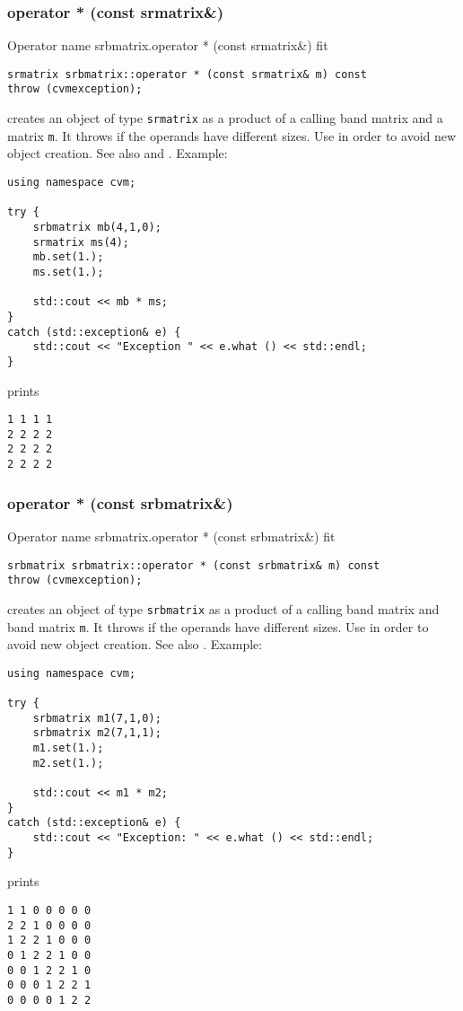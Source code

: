 \subsubsection{operator * (const srmatrix\&)}
Operator%
\pdfdest name {srbmatrix.operator * (const srmatrix&)} fit
\begin{verbatim}
srmatrix srbmatrix::operator * (const srmatrix& m) const
throw (cvmexception);
\end{verbatim}
creates an object of type \verb"srmatrix"
as a product of a calling band matrix and a matrix \verb"m".
It throws  
if the operands have different sizes.
Use  in order to avoid
 new object creation.
See also
 and .
Example:
\begin{Verbatim}
using namespace cvm;

try {
    srbmatrix mb(4,1,0);
    srmatrix ms(4);
    mb.set(1.);
    ms.set(1.);

    std::cout << mb * ms;
}
catch (std::exception& e) {
    std::cout << "Exception " << e.what () << std::endl;
}
\end{Verbatim}
prints
\begin{Verbatim}
1 1 1 1
2 2 2 2
2 2 2 2
2 2 2 2
\end{Verbatim}
\newpage



\subsubsection{operator * (const srbmatrix\&)}
Operator%
\pdfdest name {srbmatrix.operator * (const srbmatrix&)} fit
\begin{verbatim}
srbmatrix srbmatrix::operator * (const srbmatrix& m) const
throw (cvmexception);
\end{verbatim}
creates an object of type \verb"srbmatrix"
as a product of a calling band matrix and band matrix \verb"m".
It throws  
if the operands have different sizes.
Use  in order to avoid
 new object creation.
See also
.
Example:
\begin{Verbatim}
using namespace cvm;

try {
    srbmatrix m1(7,1,0);
    srbmatrix m2(7,1,1);
    m1.set(1.);
    m2.set(1.);

    std::cout << m1 * m2;
}
catch (std::exception& e) {
    std::cout << "Exception: " << e.what () << std::endl;
}
\end{Verbatim}
prints
\begin{Verbatim}
1 1 0 0 0 0 0
2 2 1 0 0 0 0
1 2 2 1 0 0 0
0 1 2 2 1 0 0
0 0 1 2 2 1 0
0 0 0 1 2 2 1
0 0 0 0 1 2 2
\end{Verbatim}
\newpage




